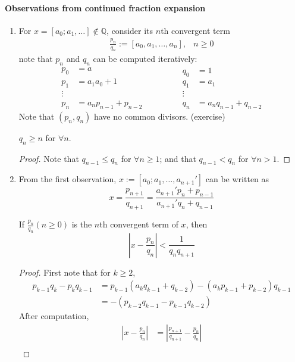 \paragraph{Observations from continued fraction expansion}
\begin{enumerate}
\item
For $x=[a_0;a_1,\dots]\notin\mathbb{Q}$, consider its $n$th convergent term
\[
\begin{array}{ll}
\frac{p_n}{q_n}:=[a_0,a_1,\dots,a_n],
&
n\ge0
\end{array}
\]
note that $p_n$ and $q_n$ can be computed iteratively:
\[
\begin{aligned}
p_0&=a\\
p_1&=a_1a_0+1\\
\vdots\\
p_n&=a_np_{n-1}+p_{n-2}
\end{aligned}
\qquad\qquad
\begin{aligned}
q_0&=1\\
q_1&=a_1\\
\vdots\\
q_n&=a_nq_{n-1}+q_{n-2}
\end{aligned}
\]
Note that $(p_n,q_n)$ have no common divisors. (exercise)
\begin{corollary}
$q_n\ge n$ for $\forall n$.
\end{corollary}
\begin{proof}
Note that $q_{n-1}\le q_n$ for $\forall n\ge1$; and that $q_{n-1}<q_n$ for $\forall n>1$.
\end{proof}
\item
From the first observation, $x:=[a_0;a_1,\dots,a_{n+1}']$ can be written as
\[
x=\frac{p_{n+1}}{q_{n+1}}=\frac{a_{n+1}'p_n + p_{n-1}}{a_{n+1}'q_n+q_{n-1}}
\]
\begin{corollary}
If $\frac{p_n}{q_n} (n\ge0)$ is the $n$th convergent term of $x$, then
\[
\left|
x-\frac{p_n}{q_n}
\right|<\frac{1}{q_{n}q_{n+1}}
\]
\end{corollary}
\begin{proof}
First note that for $k\ge2$,
\begin{align*}
p_{k-1}q_k-p_kq_{k-1}&=p_{k-1}(a_kq_{k-1}+q_{k-2})
-(a_kp_{k-1}+p_{k-2})q_{k-1}\\
&=-(p_{k-2}q_{k-1}-p_{k-1}q_{k-2})
\end{align*}
After computation,
\begin{align*}
\left|
x-\frac{p_n}{q_n}
\right|&=\left|\frac{p_{n+1}}{q_{n+1}}-\frac{p_n}{q_n}\right|\\

\end{align*}
\end{proof}
\end{enumerate}
